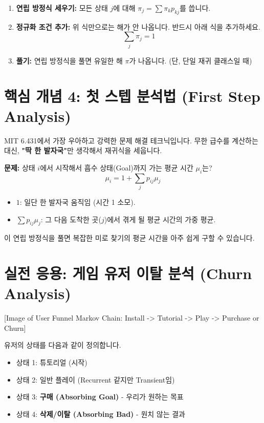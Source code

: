 \documentclass[11pt,a4paper]{book}
\theoremstyle{definition}
\begin{document}
\begin{warningbox}[title={기하 분포와 지수 분포의 관계}]
\begin{mathstep}[title={정상 상태($\pi$) 구하는 법}]
\begin{enumerate}
    \item \textbf{연립 방정식 세우기:} 모든 상태 $j$에 대해 $\pi_j = \sum \pi_k p_{kj}$를 씁니다.
    \item \textbf{정규화 조건 추가:} 위 식만으로는 해가 안 나옵니다. 반드시 아래 식을 추가하세요.
    \[ \sum_{j} \pi_j = 1 \]
    \item \textbf{풀기:} 연립 방정식을 풀면 유일한 해 $\pi$가 나옵니다. (단, 단일 재귀 클래스일 때)
\end{enumerate}
\end{mathstep}

\section{핵심 개념 4: 첫 스텝 분석법 (First Step Analysis)}

MIT 6.431에서 가장 우아하고 강력한 문제 해결 테크닉입니다. 무한 급수를 계산하는 대신, \textbf{"딱 한 발자국"}만 생각해서 재귀식을 세웁니다.

\textbf{문제:} 상태 $i$에서 시작해서 흡수 상태(Goal)까지 가는 평균 시간 $\mu_i$는?
\[ \mu_i = 1 + \sum_{j} p_{ij} \mu_j \]
\begin{itemize}
    \item $1$: 일단 한 발자국 움직임 (시간 1 소모).
    \item $\sum p_{ij} \mu_j$: 그 다음 도착한 곳($j$)에서 겪게 될 평균 시간의 가중 평균.
\end{itemize}
이 연립 방정식을 풀면 복잡한 미로 찾기의 평균 시간을 아주 쉽게 구할 수 있습니다.

\section{실전 응용: 게임 유저 이탈 분석 (Churn Analysis)}

[Image of User Funnel Markov Chain: Install -> Tutorial -> Play -> Purchase or Churn]

\begin{storybox}[title={Nexon 모바일 게임 유저 분석}]
유저의 상태를 다음과 같이 정의합니다.
\begin{itemize}
    \item 상태 1: 튜토리얼 (시작)
    \item 상태 2: 일반 플레이 (Recurrent 같지만 Transient임)
    \item 상태 3: \textbf{구매 (Absorbing Goal)} - 우리가 원하는 목표
    \item 상태 4: \textbf{삭제/이탈 (Absorbing Bad)} - 원치 않는 결과
\end{itemize}


\end{storybox}
\end{warningbox}
\end{document}
